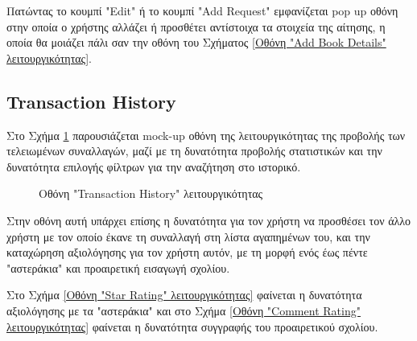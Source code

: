 \documentclass[12pt,a4paper]{article}
\begin{document}
Πατώντας το κουμπί "Edit" ή το κουμπί "Add Request" εμφανίζεται pop up οθόνη στην οποία ο χρήστης αλλάζει ή προσθέτει αντίστοιχα τα στοιχεία της αίτησης, η οποία θα μοιάζει πάλι σαν την οθόνη του Σχήματος \ref{Οθόνη "Add Book Details" λειτουργικότητας}.


\subsection{Transaction History}

Στο Σχήμα \ref{Οθόνη "Transaction History" λειτουργικότητας} παρουσιάζεται mock-up οθόνη της λειτουργικότητας της προβολής των τελειωμένων συναλλαγών, μαζί με τη δυνατότητα προβολής στατιστικών και την δυνατότητα επιλογής φίλτρων για την αναζήτηση στο ιστορικό.

\begin{figure}[H]
	\caption{Οθόνη "Transaction History" λειτουργικότητας}
	\label{Οθόνη "Transaction History" λειτουργικότητας}
\end{figure}

Στην οθόνη αυτή υπάρχει επίσης η δυνατότητα για τον χρήστη να προσθέσει τον άλλο χρήστη με τον οποίο έκανε τη συναλλαγή στη λίστα αγαπημένων του, και την καταχώρηση αξιολόγησης για τον χρήστη αυτόν, με τη μορφή ενός έως πέντε "αστεράκια" και προαιρετική εισαγωγή σχολίου.

Στο Σχήμα \ref{Οθόνη "Star Rating" λειτουργικότητας} φαίνεται η δυνατότητα αξιολόγησης με τα "αστεράκια" και στο Σχήμα \ref{Οθόνη "Comment Rating" λειτουργικότητας} φαίνεται η δυνατότητα συγγραφής του προαιρετικού σχολίου.
\end{document}
